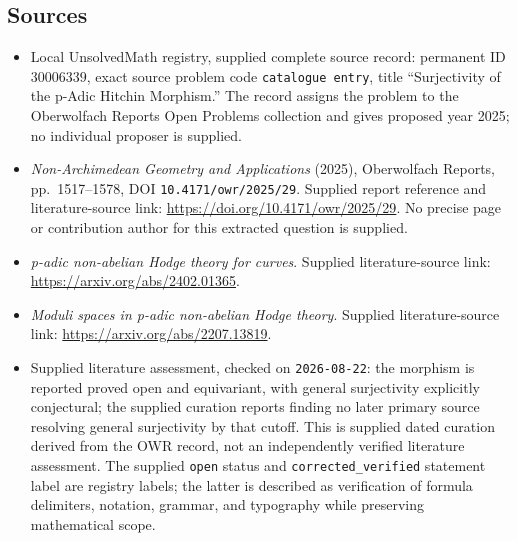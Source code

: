 \documentclass[11pt]{article}
\begin{document}
\subsection{Sources}
\begin{itemize}
\item Local UnsolvedMath registry, supplied complete source record: permanent ID \(30006339\), exact source problem code \texttt{catalogue entry}, title ``Surjectivity of the p-Adic Hitchin Morphism.'' The record assigns the problem to the Oberwolfach Reports Open Problems collection and gives proposed year 2025; no individual proposer is supplied.
\item \emph{Non-Archimedean Geometry and Applications} (2025), Oberwolfach Reports, pp.\ 1517--1578, DOI \texttt{10.4171/owr/2025/29}. Supplied report reference and literature-source link: \url{https://doi.org/10.4171/owr/2025/29}. No precise page or contribution author for this extracted question is supplied.
\item \emph{p-adic non-abelian Hodge theory for curves}. Supplied literature-source link: \url{https://arxiv.org/abs/2402.01365}.
\item \emph{Moduli spaces in p-adic non-abelian Hodge theory}. Supplied literature-source link: \url{https://arxiv.org/abs/2207.13819}.
\item Supplied literature assessment, checked on \texttt{2026-08-22}: the morphism is reported proved open and equivariant, with general surjectivity explicitly conjectural; the supplied curation reports finding no later primary source resolving general surjectivity by that cutoff. This is supplied dated curation derived from the OWR record, not an independently verified literature assessment. The supplied \texttt{open} status and \texttt{corrected\_verified} statement label are registry labels; the latter is described as verification of formula delimiters, notation, grammar, and typography while preserving mathematical scope.
\end{itemize}
\end{document}
